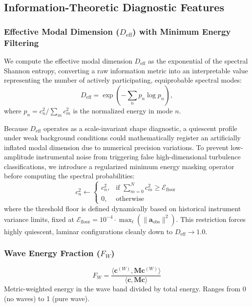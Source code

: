 \documentclass[11pt,a4paper]{article}
\begin{document}
\subsection{Information-Theoretic Diagnostic Features}
\label{sec:methods:diagnostics}

\subsubsection{Effective Modal Dimension ($D_{\mathrm{eff}}$) with Minimum Energy Filtering}

We compute the effective modal dimension $D_{\mathrm{eff}}$ as the exponential of the spectral Shannon entropy, converting a raw information metric into an interpretable value representing the number of actively participating, equiprobable spectral modes:
\begin{equation}
D_{\mathrm{eff}} = \exp\left( -\sum_n p_n \log p_n \right),
\label{eq:d_eff_def}
\end{equation}
where $p_n = c_n^2 / \sum_m c_m^2$ is the normalized energy in mode $n$.

Because $D_{\mathrm{eff}}$ operates as a scale-invariant shape diagnostic, a quiescent profile under weak background conditions could mathematically register an artificially inflated modal dimension due to numerical precision variations. To prevent low-amplitude instrumental noise from triggering false high-dimensional turbulence classifications, we introduce a regularized minimum energy masking operator before computing the spectral probabilities:
\begin{equation}
c_n^2 \leftarrow \begin{cases}
c_n^2, & \text{if } \sum_{m=0}^{N} c_m^2 \ge \mathcal{E}_{\text{floor}} \\
0, & \text{otherwise}
\end{cases}
\label{eq:energy_floor}
\end{equation}
where the threshold floor is defined dynamically based on historical instrument variance limits, fixed at $\mathcal{E}_{\text{floor}} = 10^{-4} \cdot \max_{t} \left(\|\mathbf{a}_{\mathrm{obs}}\|^2\right)$. This restriction forces highly quiescent, laminar configurations cleanly down to $D_{\mathrm{eff}} \to 1.0$.

\subsubsection{Wave Energy Fraction ($F_W$)}

\begin{equation}
F_W = \frac{\langle \mathbf{c}^{(W)}, \mathbf{M} \mathbf{c}^{(W)} \rangle}{\langle \mathbf{c}, \mathbf{M} \mathbf{c} \rangle}
\label{eq:f_w}
\end{equation}
Metric-weighted energy in the wave band divided by total energy. Ranges from 0 (no waves) to 1 (pure wave).
\end{document}
